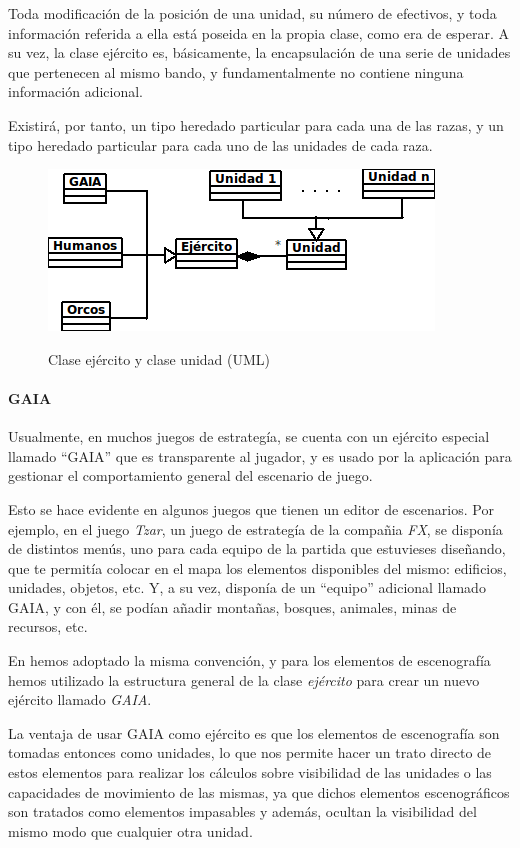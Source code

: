 Toda modificación de la posición de una unidad, su número de
efectivos, y toda información referida a ella está poseida en la
propia clase, como era de esperar. A su vez, la clase ejército es,
básicamente, la encapsulación de una serie de unidades que pertenecen
al mismo bando, y fundamentalmente no contiene ninguna información
adicional.

Existirá, por tanto, un tipo heredado particular para cada una de las
razas, y un tipo heredado particular para cada uno de las unidades de
cada raza.

\begin{figure}[h]
\centering
\includegraphics[scale=.8]{./imagenes/Ejercitos.png}
\label{fig:ejercitos}
\caption{Clase ejército y clase unidad (UML)}
\end{figure}

\paragraph{GAIA}
Usualmente, en muchos juegos de estrategía, se cuenta con un ejército
especial llamado ``GAIA'' que es transparente al jugador, y es usado
por la aplicación para gestionar el comportamiento general del
escenario de juego.

Esto se hace evidente en algunos juegos que tienen un editor de
escenarios. Por ejemplo, en el juego \emph{Tzar}, un juego de
estrategía de la compañia \emph{FX}, se disponía de distintos menús,
uno para cada equipo de la partida que estuvieses diseñando, que te
permitía colocar en el mapa los elementos disponibles del mismo:
edificios, unidades, objetos, etc. Y, a su vez, disponía de un
``equipo'' adicional llamado GAIA, y con él, se podían añadir
montañas, bosques, animales, minas de recursos, etc.

En \gom hemos adoptado la misma convención, y para los elementos de
escenografía hemos utilizado la estructura general de la clase
\emph{ejército} para crear un nuevo ejército llamado \emph{GAIA}.

La ventaja de usar GAIA como ejército es que los elementos de
escenografía son tomadas entonces como unidades, lo que nos permite hacer
un trato directo de estos elementos para realizar los cálculos sobre
visibilidad de las unidades o las capacidades de movimiento de las
mismas, ya que dichos elementos escenográficos son tratados como
elementos impasables y además, ocultan la visibilidad del mismo modo que
cualquier otra unidad.

